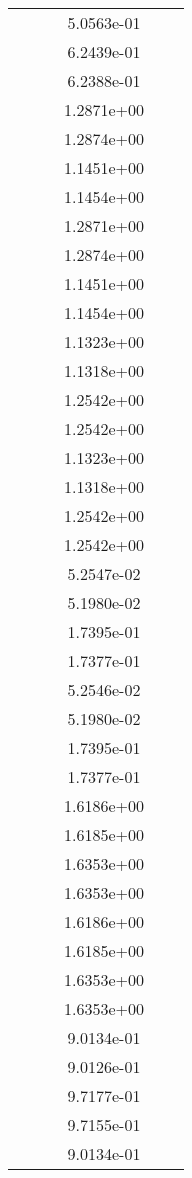 \begin{xltabular}{\textwidth}{r|rS[table-format=1.3e+2]S[table-format=1.4e+2]S[table-format=1.4e+2]S[table-format=-1.5]}
&  &  & 5.0563e-01 & & \\
&  &  & 6.2439e-01 & & \\
&  &  & 6.2388e-01 & & \\
&  &  & 1.2871e+00 & & \\
&  &  & 1.2874e+00 & & \\
&  &  & 1.1451e+00 & & \\
&  &  & 1.1454e+00 & & \\
&  &  & 1.2871e+00 & & \\
&  &  & 1.2874e+00 & & \\
&  &  & 1.1451e+00 & & \\
&  &  & 1.1454e+00 & & \\
&  &  & 1.1323e+00 & & \\
&  &  & 1.1318e+00 & & \\
&  &  & 1.2542e+00 & & \\
&  &  & 1.2542e+00 & & \\
&  &  & 1.1323e+00 & & \\
&  &  & 1.1318e+00 & & \\
&  &  & 1.2542e+00 & & \\
&  &  & 1.2542e+00 & & \\
&  &  & 5.2547e-02 & & \\
&  &  & 5.1980e-02 & & \\
&  &  & 1.7395e-01 & & \\
&  &  & 1.7377e-01 & & \\
&  &  & 5.2546e-02 & & \\
&  &  & 5.1980e-02 & & \\
&  &  & 1.7395e-01 & & \\
&  &  & 1.7377e-01 & & \\
&  &  & 1.6186e+00 & & \\
&  &  & 1.6185e+00 & & \\
&  &  & 1.6353e+00 & & \\
&  &  & 1.6353e+00 & & \\
&  &  & 1.6186e+00 & & \\
&  &  & 1.6185e+00 & & \\
&  &  & 1.6353e+00 & & \\
&  &  & 1.6353e+00 & & \\
&  &  & 9.0134e-01 & & \\
&  &  & 9.0126e-01 & & \\
&  &  & 9.7177e-01 & & \\
&  &  & 9.7155e-01 & & \\
&  &  & 9.0134e-01 & & \\

\end{xltabular}

